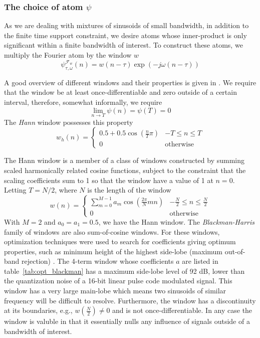 \documentclass[letterpaper,12pt]{report}
\begin{document}
\subsubsection{The choice of atom $\psi$}

As we are dealing with mixtures of sinusoids of small bandwidth, in addition to
the finite time support constraint, we desire atoms whose inner-product is only
significant within a finite bandwidth of interest. To construct these atoms, we
multiply the Fourier atom by the window $w$
\[
    \psi_{\tau,\omega}^{\mathcal{F}_{w}}(n) = w(n-\tau) \exp(-j\omega(n-\tau))
\]

A good overview of different windows and their properties is given in
\cite{harris1978use}. We require that the window be at least
once-differentiable and zero outside of a certain interval, therefore, somewhat
informally, we require
\[
    \lim_{n \rightarrow T} \psi(n) = \psi(T) = 0
\]
The \textit{Hann} window possesses this property
\[
    w_{h}(n) = \begin{cases}
        0.5 + 0.5 \cos \left( \frac{n}{T}\pi \right) & -T \leq n \leq T \\
        0 & \text{otherwise}
    \end{cases}
\]

The Hann window is a member of a class of windows constructed by summing scaled
harmonically related cosine functions, subject to the constraint that the
scaling coefficients sum to 1 so that the window have a value of 1 at $n=0$.
Letting $T=N/2$, where $N$ is the length of the window
\[
    w(n) = \begin{cases}
        \sum_{m=0}^{M-1}a_{m}\cos \left( \frac{2\pi}{N}mn \right) & -\frac{N}{2} \leq n
        \leq \frac{N}{2} \\
        0 & \text{otherwise}
    \end{cases}
\]
With $M=2$ and $a_0 = a_1 = 0.5$, we have the Hann window. The
\textit{Blackman-Harris} family of windows are also sum-of-cosine windows. For
these windows, optimization techniques were used to search for coefficients
giving optimum properties, such as minimum height of the highest side-lobe
(maximum out-of-band rejection) \cite{rabiner1970approach}. The 4-term window
whose coefficients $a$ are listed in table~\ref{tab:opt_blackman} has a maximum
side-lobe level of 92 dB, lower than the quantization noise of a 16-bit linear
pulse code modulated signal. This window has a very large main-lobe which means
two sinusoids of similar frequency will be difficult to resolve. Furthermore,
the window has a discontinuity at its boundaries, e.g.,
$w \left( \frac{N}{2} \right) \neq 0$ and is not once-differentiable. In any
case the window is valuble in that it essentially nulls any influence of signals
outside of a bandwidth of interest.
\end{document}
